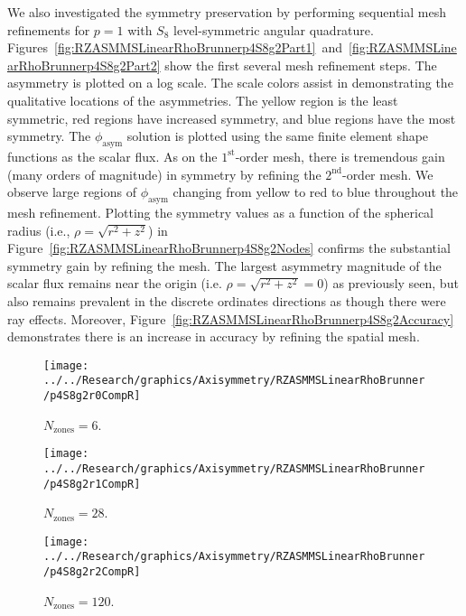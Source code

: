 \documentclass[12pt,letterpaper]{article}
\begin{document}
\FloatBarrier

We also investigated the symmetry preservation by performing sequential mesh refinements for $p=1$ with $S_8$ level-symmetric angular quadrature. Figures~\ref{fig:RZASMMSLinearRhoBrunnerp4S8g2Part1}~and~\ref{fig:RZASMMSLinearRhoBrunnerp4S8g2Part2} show the first several mesh refinement steps. The asymmetry is plotted on a log scale. The scale colors assist in demonstrating the qualitative locations of the asymmetries. The yellow region is the least symmetric, red regions have increased symmetry, and blue regions have the most symmetry. The $\phi_\text{asym}$ solution is plotted using the same finite element shape functions as the scalar flux. As on the $1^\text{st}$-order mesh, there is tremendous gain (many orders of magnitude) in symmetry by refining the $2^\text{nd}$-order mesh. We observe large regions of $\phi_\text{asym}$ changing from yellow to red to blue throughout the mesh refinement. Plotting the symmetry values as a function of the spherical radius (i.e., $\rho=\sqrt{r^2+z^2}$) in Figure~\ref{fig:RZASMMSLinearRhoBrunnerp4S8g2Nodes} confirms the substantial symmetry gain by refining the mesh. The largest asymmetry magnitude of the scalar flux remains near the origin (i.e. $\rho=\sqrt{r^2+z^2}=0$) as previously seen, but also remains prevalent in the discrete ordinates directions as though there were ray effects. Moreover, Figure~\ref{fig:RZASMMSLinearRhoBrunnerp4S8g2Accuracy} demonstrates there is an increase in accuracy by refining the spatial mesh.

\begin{sidewaysfigure}[!htb]
\centering
\begin{subfigure}{0.33\textwidth}
\texttt{[image: ../../Research/graphics/Axisymmetry/RZASMMSLinearRhoBrunner/p4S8g2r0CompR]}
\caption{$N_\text{zones}=6$.}
\end{subfigure}%
\begin{subfigure}{0.33\textwidth}
\texttt{[image: ../../Research/graphics/Axisymmetry/RZASMMSLinearRhoBrunner/p4S8g2r1CompR]}
\caption{$N_\text{zones}=28$.}
\end{subfigure}%
\begin{subfigure}{0.33\textwidth}
\texttt{[image: ../../Research/graphics/Axisymmetry/RZASMMSLinearRhoBrunner/p4S8g2r2CompR]}
\caption{$N_\text{zones}=120$.}
\end{subfigure}
\caption{Relative asymmetry for $p=4$ finite elements on a $2^\text{nd}$-order mesh for $S_8$ level-symmetric angular quadrature.}
\label{fig:RZASMMSLinearRhoBrunnerp4S8g2Part1}
\end{sidewaysfigure}
\end{document}
